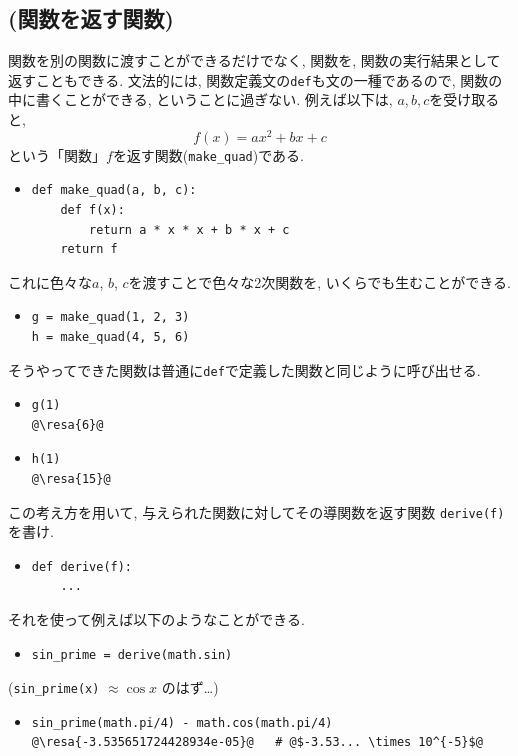 \documentclass[10pt,dvipdfmx]{article}
\newcommand{\resa}[1]{ {\textsl{$\rightarrow$ #1}}}
\begin{document}
\subsection{{\scriptsize (関数を返す関数)}}
関数を別の関数に渡すことができるだけでなく,
関数を, 関数の実行結果として返すこともできる.
文法的には, 関数定義文の{\tt def}も文の一種であるので,
関数の中に書くことができる, ということに過ぎない.
例えば以下は, $a, b, c$を受け取ると,
\[ f(x) = ax^2 + bx+ c \]
という「関数」$f$を返す関数({\tt make\_quad})である.
\begin{itemize}
\item []
\begin{lstlisting}
def make_quad(a, b, c):
    def f(x):
        return a * x * x + b * x + c
    return f  
\end{lstlisting}
\end{itemize}
これに色々な$a$, $b$, $c$を渡すことで色々な2次関数を,
いくらでも生むことができる.
\begin{itemize}
\item []
\begin{lstlisting}
g = make_quad(1, 2, 3)  
h = make_quad(4, 5, 6)  
\end{lstlisting}
\end{itemize}
そうやってできた関数は普通に{\tt def}で定義した関数と同じように呼び出せる.
\begin{itemize}
\item []
\begin{lstlisting}
g(1)
@\resa{6}@  
\end{lstlisting}
\item []
\begin{lstlisting}
h(1)
@\resa{15}@  
\end{lstlisting}
\end{itemize}

この考え方を用いて, 与えられた関数に対してその導関数を返す関数
{\tt derive(f)}を書け.
\begin{itemize}
\item []
\begin{lstlisting}
def derive(f):
    ...  
\end{lstlisting}
\end{itemize}
それを使って例えば以下のようなことができる.
\begin{itemize}
\item []
\begin{lstlisting}
sin_prime = derive(math.sin)
\end{lstlisting}
\end{itemize}
({\tt sin\_prime(x)} $\approx \cos x$ のはず\ldots)
\begin{itemize}
\item []
\begin{lstlisting}
sin_prime(math.pi/4) - math.cos(math.pi/4)
@\resa{-3.535651724428934e-05}@   # @$-3.53... \times 10^{-5}$@
\end{lstlisting}
\end{itemize}
\end{document}
